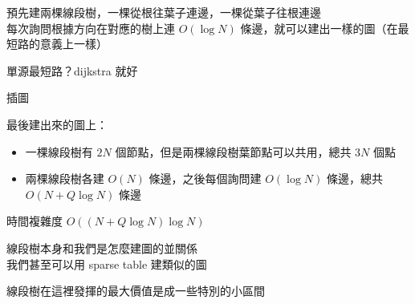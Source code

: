 \begin{frame}{\ebtitle}
\begin{figure}[h!]
\begin{center}
        \end{center}
    \end{figure}
\end{frame}

\begin{frame}{\ebtitle}
    預先建兩棵線段樹，一棵從根往葉子連邊，一棵從葉子往根連邊 \\
    每次詢問根據方向在對應的樹上連 $O(\log N)$ 條邊，就可以建出一樣的圖（在最短路的意義上一樣）

    單源最短路？dijkstra 就好
\end{frame}

\begin{frame}{\ebtitle}
    \todo 插圖
\end{frame}

\begin{frame}{\ebtitle}
    最後建出來的圖上：
    \begin{itemize}
        \item 一棵線段樹有 $2N$ 個節點，但是兩棵線段樹葉節點可以共用，總共 $3N$ 個點
        \item 兩棵線段樹各建 $O(N)$ 條邊，之後每個詢問建 $O(\log N)$ 條邊，總共 $O(N + Q \log N)$ 條邊
    \end{itemize}
    時間複雜度 $O((N + Q \log N) \log N)$
\end{frame}

\begin{frame}{\ebtitle}
    線段樹本身和我們是怎麼建圖的並關係 \\
    我們甚至可以用 sparse table 建類似的圖

    線段樹在這裡發揮的最大價值是成一些特別的小區間
\end{frame}
